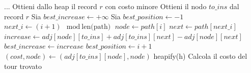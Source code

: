 \documentclass[a4paper,12pt]{report}
\begin{document}
\begin{tcolorbox}[colframe=black, colback=white, boxrule=0.5pt, title=Nearest Insertion, coltitle=black, fonttitle=\bfseries, colbacktitle=white, breakable]
  \begin{algorithmic}[1]
    \State ...
      \State Ottieni dallo heap il record $r$ con costo minore
      \State Ottieni il nodo $to\_ins$ dal record $r$
      \State Sia $best\_increase \gets +\infty$
      \State Sia $best\_position \gets -1$
        \State $next\_i \gets (i + 1) \mod \text{len(path)}$
        \State $node \gets path[i]$
        \State $next \gets path[next\_i]$
        \State $increase \gets adj[node][to\_ins] + adj[to\_ins][next] - adj[node][next]$
          \State $best\_increase \gets increase$
          \State $best\_position \gets i + 1$
        \EndIf
      \EndFor
      \State {}
          \State $(cost, node) \gets (adj[to\_ins][node], node)$
        \EndIf
      \EndFor
      \State heapify(h)
    \EndWhile
    \State Calcola il costo del tour trovato
  \end{algorithmic}
  \end{tcolorbox}
\end{document}
